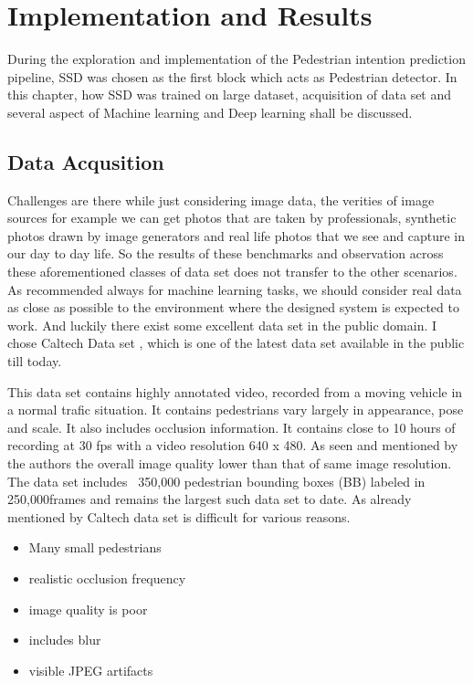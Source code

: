 \chapter{Implementation and Results}
During the exploration and implementation of the Pedestrian intention prediction pipeline, SSD was chosen as the first block which acts as Pedestrian detector. In this chapter, how SSD was trained on large dataset, acquisition of data set and several aspect of Machine learning and Deep learning shall be discussed.

\section{Data Acqusition}
Challenges are there while just considering image data, the verities of image sources for example we can get photos that are taken by professionals, synthetic photos drawn by image generators and real life photos that we see and capture in our day to day life. So the results of these benchmarks and 
observation across these aforementioned classes of data set does not transfer to the other scenarios.
As recommended always for machine learning tasks, we should consider real data as close as possible to the environment where the designed system is expected to work. And luckily there exist some excellent data set in the public domain. I chose Caltech Data set \cite{dollar2009pedestrian}, which is one of the latest data set available in the public till today. 

\newpara
This data set contains highly annotated video, recorded from a moving vehicle in a normal trafic situation. It contains pedestrians vary largely in appearance, pose and scale. It also includes occlusion information. It contains close to 10 hours of recording at 30 fps with a video resolution 640 x 480. As seen and mentioned by the authors the overall image quality lower than that of same image resolution. The data set includes ~350,000  pedestrian bounding boxes (BB) labeled in 250,000frames and remains the largest such data set to  date. As already mentioned by \cite{walk2010new} Caltech data set is difficult for various reasons.
\begin{itemize}
	\item Many small pedestrians
	\item realistic occlusion frequency
	\item image quality is poor
	\item includes blur
	\item visible JPEG artifacts
\end{itemize}

